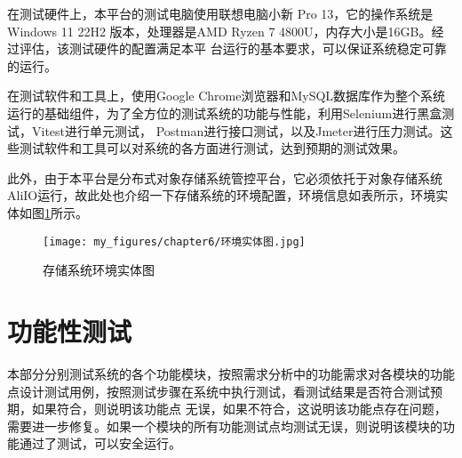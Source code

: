 在测试硬件上，本平台的测试电脑使用联想电脑小新 Pro 13，它的操作系统是Windows 11 22H2 版本，处理器是AMD Ryzen 7 4800U，内存大小是16GB。经过评估，该测试硬件的配置满足本平
台运行的基本要求，可以保证系统稳定可靠的运行。

在测试软件和工具上，使用Google Chrome浏览器和MySQL数据库作为整个系统运行的基础组件，为了全方位的测试系统的功能与性能，利用Selenium进行黑盒测试\cite{kng222eji}，Vitest进行单元测试\cite{kng2562eji}，
Postman进行接口测试，以及Jmeter进行压力测试\cite{kng232eji}。这些测试软件和工具可以对系统的各方面进行测试，达到预期的测试效果。

此外，由于本平台是分布式对象存储系统管控平台，它必须依托于对象存储系统AliIO运行，故此处也介绍一下存储系统的环境配置，环境信息如表所示，环境实体如图\ref{fig:存储系统环境实体图}所示。

\begin{center}
    \renewcommand\arraystretch{1.5}{
    }
    \vspace{-1cm}
\end{center}


\begin{figure}[htb]
    \centering
    \texttt{[image: my\_figures/chapter6/环境实体图.jpg]}
    \caption{存储系统环境实体图}
    \label{fig:存储系统环境实体图}
\end{figure}


\section{功能性测试}

本部分分别测试系统的各个功能模块，按照需求分析中的功能需求对各模块的功能点设计测试用例，按照测试步骤在系统中执行测试，看测试结果是否符合测试预期，如果符合，则说明该功能点
无误，如果不符合，这说明该功能点存在问题，需要进一步修复。如果一个模块的所有功能测试点均测试无误，则说明该模块的功能通过了测试，可以安全运行。


